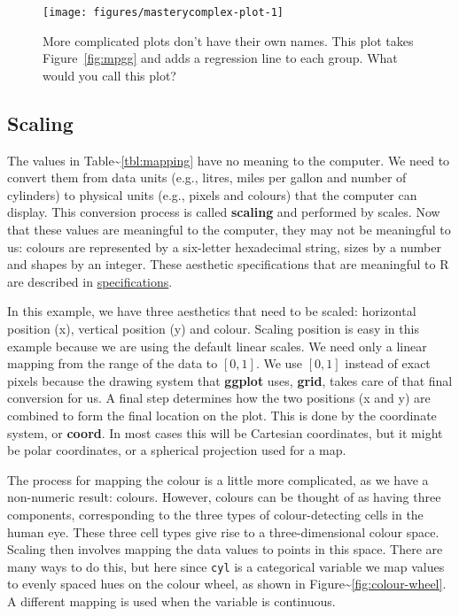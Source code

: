 \begin{figure}
\texttt{[image: figures/masterycomplex-plot-1]} \caption{More complicated plots don't have their own names. This plot takes Figure~\ref{fig:mpgg} and adds a regression line to each group. What would you call this plot?\label{fig:complex-plot}}
\end{figure}

\subsection{Scaling}

The values in Table\textasciitilde{}\ref{tbl:mapping} have no meaning to
the computer. We need to convert them from data units (e.g., litres,
miles per gallon and number of cylinders) to physical units (e.g.,
pixels and colours) that the computer can display. This conversion
process is called \textbf{scaling} and performed by scales. Now that
these values are meaningful to the computer, they may not be meaningful
to us: colours are represented by a six-letter hexadecimal string, sizes
by a number and shapes by an integer. These aesthetic specifications
that are meaningful to R are described in
\hyperref[cha:specifications]{specifications}.

In this example, we have three aesthetics that need to be scaled:
horizontal position (x), vertical position (y) and colour. Scaling
position is easy in this example because we are using the default linear
scales. We need only a linear mapping from the range of the data to
$[0, 1]$. We use $[0, 1]$ instead of exact pixels because the drawing
system that \textbf{ggplot} uses, \textbf{grid}, takes care of that
final conversion for us. A final step determines how the two positions
(x and y) are combined to form the final location on the plot. This is
done by the coordinate system, or \textbf{coord}. In most cases this
will be Cartesian coordinates, but it might be polar coordinates, or a
spherical projection used for a map.

The process for mapping the colour is a little more complicated, as we
have a non-numeric result: colours. However, colours can be thought of
as having three components, corresponding to the three types of
colour-detecting cells in the human eye. These three cell types give
rise to a three-dimensional colour space. Scaling then involves mapping
the data values to points in this space. There are many ways to do this,
but here since \texttt{cyl} is a categorical variable we map values to
evenly spaced hues on the colour wheel, as shown in
Figure\textasciitilde{}\ref{fig:colour-wheel}. A different mapping is
used when the variable is continuous. 

